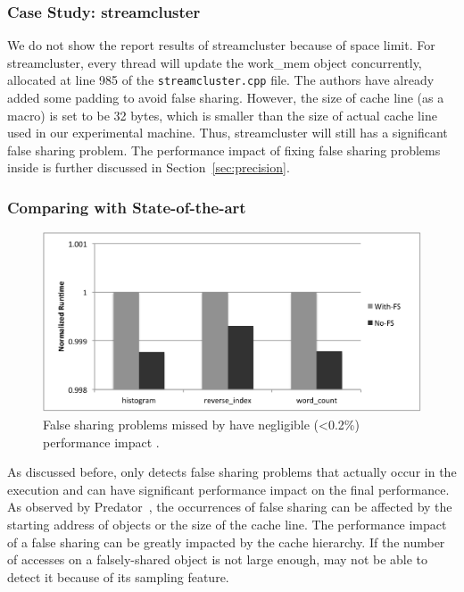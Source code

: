\subsubsection{Case Study: streamcluster}

We do not show the report results of streamcluster because of space limit. For streamcluster, every thread will update the work\_mem object concurrently, allocated at line 985 of the \texttt{streamcluster.cpp} file. The authors have already added some padding to avoid false sharing. However, the size of cache line (as a macro) is set to be 32 bytes, which is smaller than the size of actual cache line used in our experimental machine. Thus, streamcluster will still has a significant false sharing problem. The performance impact of fixing false sharing problems inside is further discussed in Section~\ref{sec:precision}. 


\subsubsection{Comparing with State-of-the-art}

\begin{figure}[htbp]
\centering
\label{fig:fseffectiveness}
\includegraphics[width=1\columnwidth]{figure/trivial.pdf}
\caption{False sharing problems missed by \cheetah{} have negligible (<0.2\%) performance impact .}
\end{figure}

As discussed before, \cheetah{} only detects false sharing problems that actually occur in the execution and can have significant performance impact on the final performance. As observed by Predator~\cite{Predator}, the occurrences of false sharing can be affected by the starting address of objects or the size of the cache line. The performance impact of a false sharing can be greatly impacted by the cache hierarchy. If the number of accesses on a falsely-shared object is not large enough, \cheetah{} may not be able to detect it because of its sampling feature. 

